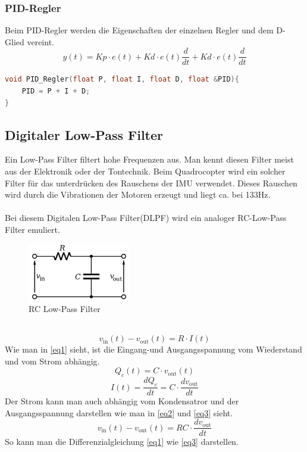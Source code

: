 \documentclass[12pt,a4paper, ngerman]{article}
\begin{document}
\subsubsection{PID-Regler}
Beim PID-Regler werden die Eigenschaften der einzelnen Regler und dem D-Glied vereint.
\begin{equation}
y(t)=Kp\cdot e(t)+Kd\cdot e(t)\frac{d}{dt}+Kd\cdot e(t)\frac{d}{dt}
\end{equation}
\begin{lstlisting}[language=C++,caption=D-Regler C++ Pseudocode]
void PID_Regler(float P, float I, float D, float &PID){
	PID = P + I + D;
}
\end{lstlisting}
\subsection{Digitaler Low-Pass Filter}
Ein Low-Pass Filter filtert hohe Frequenzen aus. Man kennt diesen Filter meist aus der Elektronik oder der Tontechnik. Beim Quadrocopter wird ein solcher Filter für das unterdrücken des Rauschens der IMU verwendet. Dieses Rauschen wird durch die Vibrationen der Motoren erzeugt und liegt ca. bei 133Hz.\\ \\
Bei diesem Digitalen Low-Pass Filter(DLPF) wird ein analoger RC-Low-Pass Filter emuliert.\cite{website:Wikipedia_LPF}\\
\begin{figure}[h]
\centering
\includegraphics[width=0.4\textwidth]{DLPF1.png}
\caption[aasdf]{RC Low-Pass Filter}
\end{figure}\\
\begin{equation} \label{eq1}
v_{\text{in}}(t)-v_{\text{out}}(t)=R\cdot I(t)
\end{equation}
Wie man in \ref{eq1} sieht, ist die Eingang-und Ausgangsspannung vom Wiederstand und vom Strom abhängig.
\begin{equation} \label{eq2}
Q_{c}(t)=C\cdot v_{\text{out}}(t)
\end{equation}
\begin{equation} \label{eq3}
I(t)=\frac{dQ_{c}}{dt}=C\cdot \frac{dv_{\text{out}}}{dt}
\end{equation}
Der Strom kann man auch abhängig vom Kondensatror und der Ausgangsspannung darstellen wie man in \ref{eq2} und \ref{eq3} sieht.
\begin{equation}
v_{\text{in}}(t)-v_{\text{out}}(t)=RC\cdot \frac{dv_{\text{out}}}{dt}
\end{equation}
So kann man die Differenzialgleichung \ref{eq1} wie \ref{eq3} darstellen.\\
\end{document}
